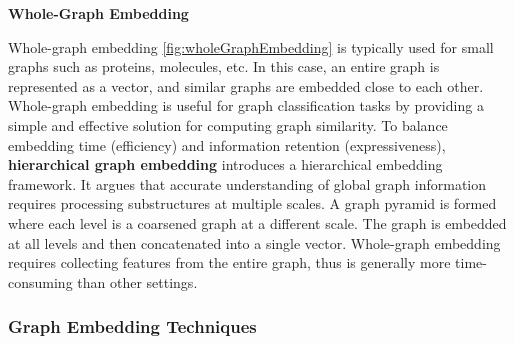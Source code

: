 \textbf{Whole-Graph Embedding}

Whole-graph embedding \autoref{fig:wholeGraphEmbedding} is typically used for small graphs such as proteins, molecules, etc. In this case, an entire graph is represented as a vector, and similar graphs are embedded close to each other. Whole-graph embedding is useful for graph classification tasks by providing a simple and effective solution for computing graph similarity. To balance embedding time (efficiency) and information retention (expressiveness), \textbf{hierarchical graph embedding} \cite{mousavi2017hierarchical} introduces a hierarchical embedding framework. It argues that accurate understanding of global graph information requires processing substructures at multiple scales. A graph pyramid is formed where each level is a coarsened graph at a different scale. The graph is embedded at all levels and then concatenated into a single vector. Whole-graph embedding requires collecting features from the entire graph, thus is generally more time-consuming than other settings.


\subsubsection{Graph Embedding Techniques}

